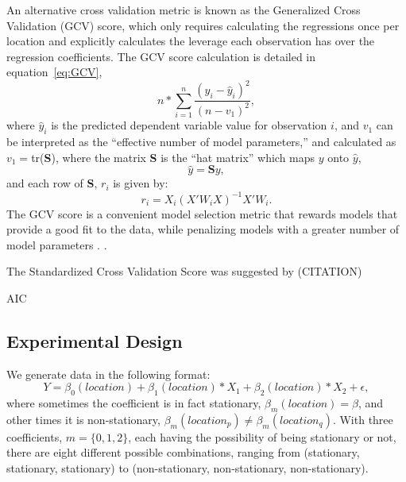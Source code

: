 \documentclass{article}\usepackage[]{graphicx}\usepackage[]{color}
\begin{document}
An alternative cross validation metric is known as the Generalized Cross Validation (GCV) score, which only requires calculating the regressions once per location and explicitly calculates the leverage each observation has over the regression coefficients. The GCV score calculation is detailed in equation~\eqref{eq:GCV},
\begin{equation}\label{eq:GCV}
n*\sum_{i=1}^{n}\frac{(y_i-\hat{y}_i)^2}{(n-v_1)^2}, 
\end{equation} 
where $\hat{y}_i$ is the predicted dependent variable value for observation $i$, and $v_1$ can be interpreted as the ``effective number of model parameters,'' and calculated as $v_1=$tr(\textbf{S}), where the matrix \textbf{S} is the ``hat matrix'' which maps $y$ onto $\hat{y}$,
                   \begin{equation}
                   \hat{y}=\textbf{S}y,
                   \end{equation}
                   and each row of \textbf{S}, $r_i$ is given by:
                  \begin{equation}
                   r_i=X_i(X'W_iX)^{-1}X'W_i.
                   \end{equation}
The GCV score is a convenient model selection metric that rewards models that provide a good fit to the data, while penalizing models with a greater number of model parameters \citep{Loader1999, McMillen2010}.  \citep{Paez2011, McMillen2010, McMillen2012}. 

The Standardized Cross Validation Score was suggested by (CITATION)

AIC

\subsection{Experimental Design}

We generate data in the following format:
\begin{equation}
Y = \beta _0(location) + \beta _1(location) *X_1 + \beta _2(location) * X_2 + \epsilon ,
\end{equation}
where sometimes the coefficient is in fact stationary, $\beta _m(location) = \beta$, and other times it is non-stationary, $\beta _m (location_p) \neq \beta _m (location_q)$. With three coefficients, $m = \{0, 1, 2\}$, each having the possibility of being stationary or not, there are eight different possible combinations, ranging from (stationary, stationary, stationary) to (non-stationary, non-stationary, non-stationary).
\end{document}
